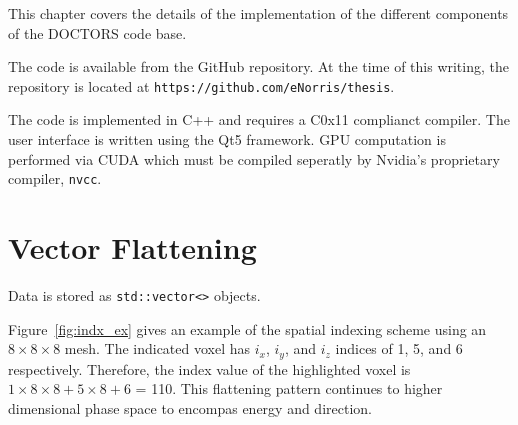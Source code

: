 


This chapter covers the details of the implementation of the different components of the DOCTORS code base.

The code is available from the GitHub repository. At the time of this writing, the repository is located at \texttt{https://github.com/eNorris/thesis}.

The code is implemented in C++ and requires a C0x11 complianct compiler. The user interface is written using the Qt5 framework. GPU computation is performed via CUDA which must be compiled seperatly by Nvidia's proprietary compiler, \texttt{nvcc}.

\section{Vector Flattening}\label{sec:flatten}

Data is stored as \texttt{std::vector<>} objects.

Figure~\ref{fig:indx_ex} gives an example of the spatial indexing scheme using an $8 \times 8 \times 8$ mesh. The indicated voxel has $i_x$, $i_y$, and $i_z$ indices of 1, 5, and 6 respectively. Therefore, the index value of the highlighted voxel is $1 \times 8 \times 8 + 5 \times 8 + 6$ = 110. This flattening pattern continues to higher dimensional phase space to encompas energy and direction.

